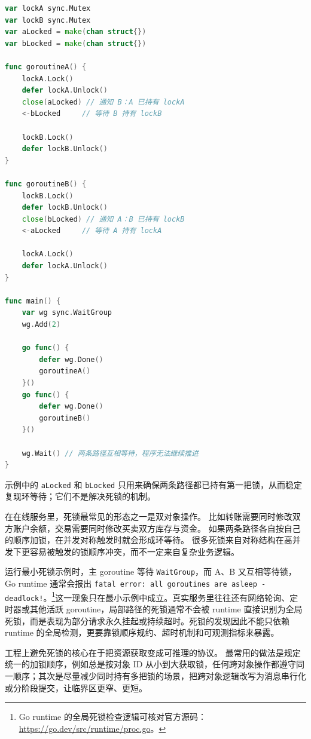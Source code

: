 \begin{tcolorbox}[title=死锁：锁顺序不一致导致环等待（示意）]
\begin{lstlisting}[style=codeblock, language=go]
var lockA sync.Mutex
var lockB sync.Mutex
var aLocked = make(chan struct{})
var bLocked = make(chan struct{})

func goroutineA() {
    lockA.Lock()
    defer lockA.Unlock()
    close(aLocked) // 通知 B：A 已持有 lockA
    <-bLocked     // 等待 B 持有 lockB

    lockB.Lock()
    defer lockB.Unlock()
}

func goroutineB() {
    lockB.Lock()
    defer lockB.Unlock()
    close(bLocked) // 通知 A：B 已持有 lockB
    <-aLocked     // 等待 A 持有 lockA

    lockA.Lock()
    defer lockA.Unlock()
}

func main() {
    var wg sync.WaitGroup
    wg.Add(2)

    go func() {
        defer wg.Done()
        goroutineA()
    }()
    go func() {
        defer wg.Done()
        goroutineB()
    }()

    wg.Wait() // 两条路径互相等待，程序无法继续推进
}
\end{lstlisting}
\end{tcolorbox}

示例中的 \texttt{aLocked} 和 \texttt{bLocked} 只用来确保两条路径都已持有第一把锁，从而稳定复现环等待；它们不是解决死锁的机制。

在在线服务里，死锁最常见的形态之一是双对象操作。
比如转账需要同时修改双方账户余额，交易需要同时修改买卖双方库存与资金。
如果两条路径各自按自己的顺序加锁，在并发对称触发时就会形成环等待。
很多死锁来自对称结构在高并发下更容易被触发的锁顺序冲突，而不一定来自复杂业务逻辑。

运行最小死锁示例时，主 goroutine 等待 \texttt{WaitGroup}，而 A、B 又互相等待锁，Go runtime 通常会报出 \texttt{fatal error: all goroutines are asleep - deadlock!}。\footnote{Go runtime 的全局死锁检查逻辑可核对官方源码：\url{https://go.dev/src/runtime/proc.go}。}这一现象只在最小示例中成立。真实服务里往往还有网络轮询、定时器或其他活跃 goroutine，局部路径的死锁通常不会被 runtime 直接识别为全局死锁，而是表现为部分请求永久挂起或持续超时。死锁的发现因此不能只依赖 runtime 的全局检测，更要靠锁顺序规约、超时机制和可观测指标来暴露。

工程上避免死锁的核心在于把资源获取变成可推理的协议。
最常用的做法是规定统一的加锁顺序，例如总是按对象 ID 从小到大获取锁，任何跨对象操作都遵守同一顺序；其次是尽量减少同时持有多把锁的场景，把跨对象逻辑改写为消息串行化或分阶段提交，让临界区更窄、更短。


